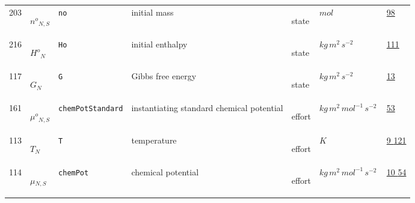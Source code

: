 \begin{longtable}{|p{1cm}|p{2.5cm}|p{4.5cm}|p{8cm}|p{3.0cm}|p{3cm}|p{1cm}|}
                 \\
            203
             & \hypertarget{"v:203"}{ $ {{n^o}}{_{N, S}} $}
             & \verb|no|
             & initial mass
             & \begin{lay}state \end{lay}
             & $ mol \, $
             &                 \hyperlink{"e:98"}{ 98 }
                 \\
            216
             & \hypertarget{"v:216"}{ $ {{H^o}}{_{N}} $}
             & \verb|Ho|
             & initial enthalpy
             & \begin{lay}state \end{lay}
             & $ kg \,m^{2} \,s^{-2} \, $
             &                 \hyperlink{"e:111"}{ 111 }
                 \\
            117
             & \hypertarget{"v:117"}{ $ {G}{_{N}} $}
             & \verb|G|
             & Gibbs free energy
             & \begin{lay}state \end{lay}
             & $ kg \,m^{2} \,s^{-2} \, $
             &                 \hyperlink{"e:13"}{ 13 }
                 \\
            161
             & \hypertarget{"v:161"}{ $ {{\mu^o}}{_{N, S}} $}
             & \verb|chemPotStandard|
             & instantiating standard chemical potential
             & \begin{lay}effort \end{lay}
             & $ kg \,m^{2} \,mol^{-1} \,s^{-2} \, $
             &                 \hyperlink{"e:53"}{ 53 }
                 \\
            113
             & \hypertarget{"v:113"}{ $ {T}{_{N}} $}
             & \verb|T|
             & temperature
             & \begin{lay}effort \end{lay}
             & $ K \, $
             &                 \hyperlink{"e:9"}{ 9 }
                                 \hyperlink{"e:121"}{ 121 }
                 \\
            114
             & \hypertarget{"v:114"}{ $ {{\mu}}{_{N, S}} $}
             & \verb|chemPot|
             & chemical potential
             & \begin{lay}effort \end{lay}
             & $ kg \,m^{2} \,mol^{-1} \,s^{-2} \, $
             &                 \hyperlink{"e:10"}{ 10 }
                                 \hyperlink{"e:54"}{ 54 }

\end{longtable}
